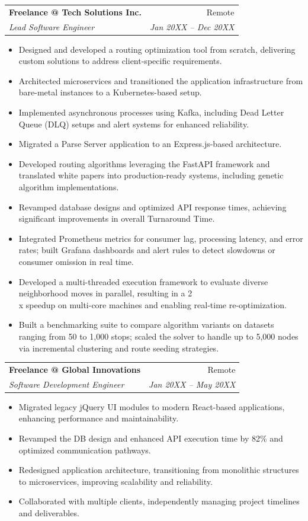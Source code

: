 \documentclass[letterpaper,10pt]{article}
\makeatletter
\newcommand{\resumeSubheading}[4]{
  \vspace{-1pt}\item
    \begin{tabular*}{0.97\textwidth}[t]{l@{\extracolsep{\fill}}r}
      \textbf{#1} & #2 \\
      \textit{\footnotesize#3} & \textit{\footnotesize #4} \\
    \end{tabular*}\vspace{-5pt}
}
\newcommand{\resumeItemListStart}{\begin{itemize}}
\newcommand{\resumeItemListEnd}{\end{itemize}\vspace{-5pt}}
\makeatother
\begin{document}
    \resumeSubheading
      {Freelance @ Tech Solutions Inc.}{Remote}
      {Lead Software Engineer}{Jan 20XX -- Dec 20XX}
      \resumeItemListStart
        \item \small Designed and developed a routing optimization tool from scratch, delivering custom solutions to address client-specific requirements.
        \item \small Architected microservices and transitioned the application infrastructure from bare-metal instances to a Kubernetes-based setup.
        \item \small Implemented asynchronous processes using Kafka, including Dead Letter Queue (DLQ) setups and alert systems for enhanced reliability.
        \item \small Migrated a Parse Server application to an Express.js-based architecture.
        \item \small Developed routing algorithms leveraging the FastAPI framework and translated white papers into production-ready systems, including genetic algorithm implementations.
        \item \small Revamped database designs and optimized API response times, achieving significant improvements in overall Turnaround Time.
        \item \small Integrated Prometheus metrics for consumer lag, processing latency, and error rates; built Grafana dashboards and alert rules to detect slowdowns or consumer omission in real time.
        \item \small Developed a multi-threaded execution framework to evaluate diverse neighborhood moves in parallel, resulting in a 2\\x speedup on multi-core machines and enabling real-time re-optimization.
        \item \small Built a benchmarking suite to compare algorithm variants on datasets ranging from 50 to 1,000 stops; scaled the solver to handle up to 5,000 nodes via incremental clustering and route seeding strategies.
      \resumeItemListEnd

    \resumeSubheading
      {Freelance @ Global Innovations}{Remote}
      {Software Development Engineer}{Jan 20XX -- May 20XX}
      \resumeItemListStart
        \item \small Migrated legacy jQuery UI modules to modern React-based applications, enhancing performance and maintainability.
        \item \small Revamped the DB design and enhanced API execution time by 82\% and optimized communication pathways.
        \item \small Redesigned application architecture, transitioning from monolithic structures to microservices, improving scalability and reliability.
        \item \small Collaborated with multiple clients, independently managing project timelines and deliverables.
      \resumeItemListEnd
\end{document}
